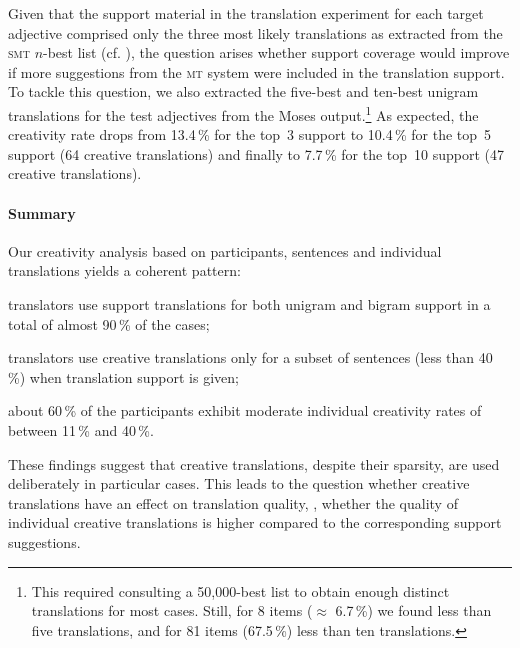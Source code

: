 \documentclass[output=paper]{LSP/langsci}
\begin{document}
Given that the support material in the translation experiment for 
each target adjective comprised only the three most likely translations 
as extracted from the \textsc{smt} $n$-best list (cf. ), the question arises whether
support coverage would improve if more suggestions from the
\textsc{mt} system were included in the translation support.
%
To tackle this question, we also extracted the five-best and ten-best
unigram translations for the test adjectives from the Moses
output.\footnote{This required consulting a 50,000-best list to obtain
  enough distinct translations for most cases. Still, for 8 items
  ($\approx$ 6.7\,\%) we found less than five translations, and for
  81 items (67.5\,\%) less than ten translations.}  As expected,
the creativity rate drops from 13.4\,\% for the top~3 support to 10.4\,\%
for the top~5 support (64 creative translations) and finally to 7.7\,\%
for the top~10 support (47 creative translations).



\paragraph{Summary}
Our creativity analysis based on participants, sentences and
individual translations yields a coherent pattern:
\begin{inparaenum}[(a)]
\item translators use support translations for both unigram and
  bigram support in a total of almost 90\,\% of the cases;
\item translators use creative translations only for a subset of
  sentences (less than 40\,\%) when translation support is given;
\item about 60\,\% of the participants exhibit moderate individual
  creativity rates of between 11\,\% and 40\,\%.
\end{inparaenum}
These findings suggest that creative translations, despite their
sparsity, are used deliberately in particular cases. This leads to the
question whether creative translations have an effect on translation
quality, \ie, whether the quality of individual creative
translations is higher compared to the corresponding support
suggestions. 
\end{document}
